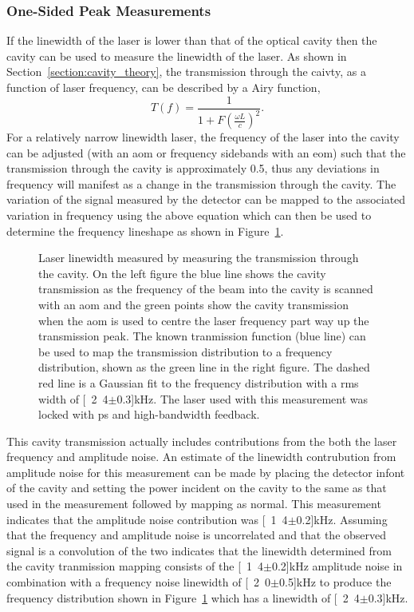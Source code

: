 \subsubsection{One-Sided Peak Measurements}\label{section:one_sided_peak}

If the linewidth of the laser is lower than that of the optical cavity then the cavity can be used to measure the linewidth of the laser.
As shown in Section~\ref{section:cavity_theory}, the transmission through the caivty, as a function of laser frequency, can be described by a Airy function,
\begin{equation}
T(f) = \frac{1}{1+F\left(\frac{\omega L}{c}\right)^2}.
\end{equation}
For a relatively narrow linewidth laser, the frequency of the laser into the cavity can be adjusted (with an \gls{aom} or frequency sidebands with an \gls{eom}) such that the transmission through the cavity is approximately 0.5, thus any deviations in frequency will manifest as a change in the transmission through the cavity.
The variation of the signal measured by the detector can be mapped to the associated variation in frequency using the above equation which can then be used to determine the frequency lineshape as shown in Figure~\ref{figure:side_of_peak}.

\begin{figure}
\center

\caption{Laser linewidth measured by measuring the transmission through the cavity. On the left figure the blue line shows the cavity transmission as the frequency of the beam into the cavity is scanned with an \gls{aom} and the green points show the cavity transmission when the \gls{aom} is used to centre the laser frequency part way up the transmission peak.
The known tranmission function (blue line) can be used to map the transmission distribution to a frequency distribution, shown as the green line in the right figure.
The dashed red line is a Gaussian fit to the frequency distribution with a \gls{rms} width of \unit[2.4$\pm$0.3]{kHz}.
The laser used with this measurement was locked with \gls{ps} and high-bandwidth feedback.}
\label{figure:side_of_peak}
\end{figure}

This cavity transmission actually includes contributions from the both the laser frequency and amplitude noise.
An estimate of the linewidth contrubution from amplitude noise for this measurement can be made by placing the detector infont of the cavity and setting the power incident on the cavity to the same as that used in the measurement followed by mapping as normal.
This measurement indicates that the amplitude noise contribution was \unit[1.4$\pm$0.2]{kHz}.
Assuming that the frequency and amplitude noise is uncorrelated and that the observed signal is a convolution of the two indicates that the linewidth determined from the cavity tranmission mapping consists of the \unit[1.4$\pm$0.2]{kHz} amplitude noise in combination with a frequency noise linewidth of \unit[2.0$\pm$0.5]{kHz} to produce the frequency distribution shown in Figure~\ref{figure:side_of_peak} which has a linewidth of \unit[2.4$\pm$0.3]{kHz}.

